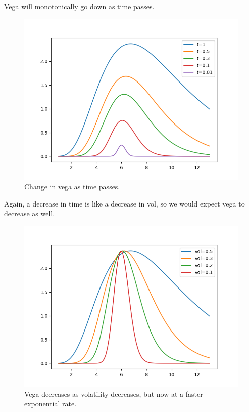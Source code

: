 \documentclass{article}
\begin{document}
    \begin{theorem}
      Vega will monotonically go down as time passes. 
      \begin{figure}[H]
        \centering 
        \includegraphics[scale=0.4]{img/vega_wrt_time.png}
        \caption{Change in vega as time passes.} 
        \label{fig:vega_wrt_time}
      \end{figure}
    \end{theorem}

    \begin{theorem}
      Again, a decrease in time is like a decrease in vol, so we would expect vega to decrease as well. 
      \begin{figure}[H]
        \centering 
        \includegraphics[scale=0.4]{img/vega_wrt_vol.png}
        \caption{Vega decreases as volatility decreases, but now at a faster exponential rate. } 
        \label{fig:vega_wrt_vol}
      \end{figure}
    \end{theorem}
\end{document}
